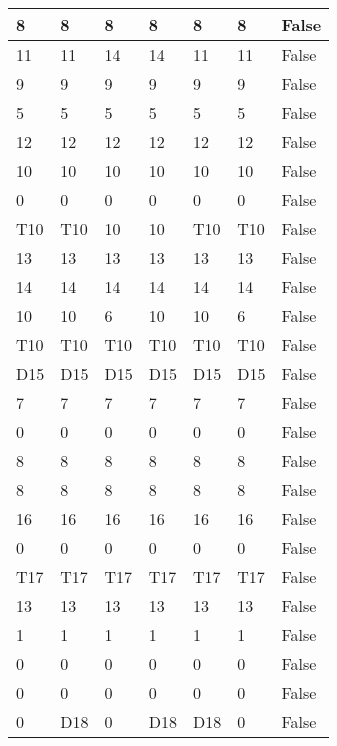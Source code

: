 \begin{longtable}[htbp]{| p{} | p{} | p{}| p{}| p{}| p{}| p{}|}
8 & 8 & 8 & 8 & 8 & 8 & False \\ \hline
11 & 11 & 14 & 14 & 11 & 11 & False \\ \hline
9 & 9 & 9 & 9 & 9 & 9 & False \\ \hline
5 & 5 & 5 & 5 & 5 & 5 & False \\ \hline
12 & 12 & 12 & 12 & 12 & 12 & False \\ \hline
10 & 10 & 10 & 10 & 10 & 10 & False \\ \hline
0 & 0 & 0 & 0 & 0 & 0 & False \\ \hline
\multicolumn{1}{|l|}{T10} & \multicolumn{1}{l|}{T10} & 10 & 10 & \multicolumn{1}{l|}{T10} & \multicolumn{1}{l|}{T10} & False \\ \hline
13 & 13 & 13 & 13 & 13 & 13 & False \\ \hline
14 & 14 & 14 & 14 & 14 & 14 & False \\ \hline
10 & 10 & 6 & 10 & 10 & 6 & False \\ \hline
\multicolumn{1}{|l|}{T10} & \multicolumn{1}{l|}{T10} & \multicolumn{1}{l|}{T10} & \multicolumn{1}{l|}{T10} & \multicolumn{1}{l|}{T10} & \multicolumn{1}{l|}{T10} & False \\ \hline
\multicolumn{1}{|l|}{D15} & \multicolumn{1}{l|}{D15} & \multicolumn{1}{l|}{D15} & \multicolumn{1}{l|}{D15} & \multicolumn{1}{l|}{D15} & \multicolumn{1}{l|}{D15} & False \\ \hline
7 & 7 & 7 & 7 & 7 & 7 & False \\ \hline
0 & 0 & 0 & 0 & 0 & 0 & False \\ \hline
8 & 8 & 8 & 8 & 8 & 8 & False \\ \hline
8 & 8 & 8 & 8 & 8 & 8 & False \\ \hline
16 & 16 & 16 & 16 & 16 & 16 & False \\ \hline
0 & 0 & 0 & 0 & 0 & 0 & False \\ \hline
\multicolumn{1}{|l|}{T17} & \multicolumn{1}{l|}{T17} & \multicolumn{1}{l|}{T17} & \multicolumn{1}{l|}{T17} & \multicolumn{1}{l|}{T17} & \multicolumn{1}{l|}{T17} & False \\ \hline
13 & 13 & 13 & 13 & 13 & 13 & False \\ \hline
1 & 1 & 1 & 1 & 1 & 1 & False \\ \hline
0 & 0 & 0 & 0 & 0 & 0 & False \\ \hline
0 & 0 & 0 & 0 & 0 & 0 & False \\ \hline
0 & \multicolumn{1}{l|}{D18} & 0 & \multicolumn{1}{l|}{D18} & \multicolumn{1}{l|}{D18} & 0 & False \\ \hline

\end{longtable}
